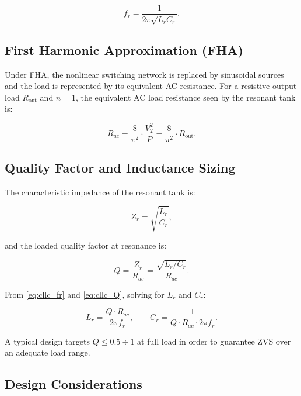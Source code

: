 \documentclass[a4paper, 11pt]{article}
\begin{document}
	\begin{equation}
		f_r = \frac{1}{2\pi\sqrt{L_r C_r}}.
		\label{eq:cllc_fr}
	\end{equation}
	
	\subsection{First Harmonic Approximation (FHA)}
	
	Under FHA, the nonlinear switching network is replaced by sinusoidal
	sources and the load is represented by its equivalent AC resistance.
	For a resistive output load $R_{\text{out}}$ and $n = 1$, the
	equivalent AC load resistance seen by the resonant tank is:
	
	\begin{equation}
		R_{ac} = \frac{8}{\pi^2} \cdot \frac{V_2^2}{P}
		= \frac{8}{\pi^2} \cdot R_{\text{out}}.
		\label{eq:cllc_rac}
	\end{equation}
	
	\subsection{Quality Factor and Inductance Sizing}
	
	The characteristic impedance of the resonant tank is:
	
	\begin{equation}
		Z_r = \sqrt{\frac{L_r}{C_r}},
		\label{eq:cllc_zr}
	\end{equation}
	
	and the loaded quality factor at resonance is:
	
	\begin{equation}
		Q = \frac{Z_r}{R_{ac}} = \frac{\sqrt{L_r / C_r}}{R_{ac}}.
		\label{eq:cllc_Q}
	\end{equation}
	
	From \eqref{eq:cllc_fr} and \eqref{eq:cllc_Q}, solving for $L_r$ and
	$C_r$:
	
	\begin{equation}
		\boxed{L_r = \frac{Q \cdot R_{ac}}{2\pi f_r},}
		\qquad
		C_r = \frac{1}{Q \cdot R_{ac} \cdot 2\pi f_r}.
		\label{eq:cllc_LrCr}
	\end{equation}
	
	A typical design targets $Q \leq 0.5 \div 1$ at full load in order
	to guarantee ZVS over an adequate load range.
	
	\subsection{Design Considerations}
	
\end{document}
